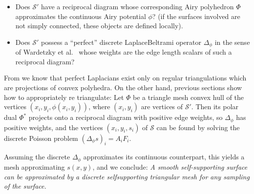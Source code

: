 \documentclass[review]{acmsiggraph}
\def\SS{{\mathcal S}}
\begin{document}
\begin{itemize}\itemsep-\parsep

\item Does $\SS'$ have a reciprocal diagram whose corresponding Airy 
polyhedron $\Phi$ approximates the continuous Airy potential $\phi$? (if 
the surfaces involved are not simply connected, these objects are defined 
locally).

\item Does $\SS'$ possess a ``perfect'' discrete Laplace\dash Beltrami 
operator $\Delta_\phi$ in the sense of Wardetzky et 
al.~ whose weights are the edge length scalars of 
such a reciprocal diagram?

\end{itemize}

From \cite{wardetzky07} we know that perfect Laplacians exist only on 
regular triangulations which are projections of convex polyhedra. On the 
other hand, previous sections show how to appropriately re\dash 
triangulate: Let $\Phi$ be a triangle mesh convex hull of the vertices 
$(x_i,y_i,\phi(x_i,y_i))$, where $(x_i,y_i)$ are vertices of $\SS'$. Then 
its polar dual $\Phi^*$ projects onto a reciprocal diagram with positive 
edge weights, so $\Delta_\phi$ has positive weights, and the vertices 
$(x_i,y_i,s_i)$ of $\SS$ can be found by solving the discrete Poisson 
problem $(\Delta_\phi s)_i=A_iF_i$.

Assuming the discrete $\Delta_\phi$ approximates its continuous 
counterpart, this yields a mesh approximating $s(x,y)$, and we conclude:
{\it A smooth self-supporting surface can be approximated by a discrete
self\dash supporting triangular mesh for any sampling of the surface.}
\end{document}
